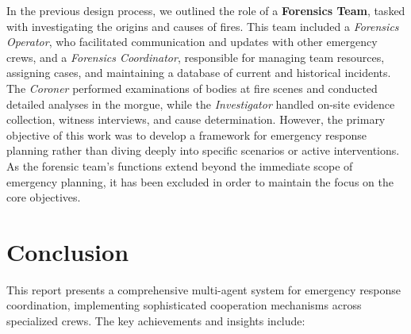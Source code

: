 \documentclass[12pt,a4paper]{article}
\begin{document}
In the previous design process, we outlined the role of a \textbf{Forensics Team}, tasked with investigating the origins and causes 
of fires. This team included a \textit{Forensics Operator}, who facilitated communication and updates with other emergency crews, 
and a \textit{Forensics Coordinator}, responsible for managing team resources, assigning cases, and maintaining a database of current 
and historical incidents. The \textit{Coroner} performed examinations of bodies at fire scenes and conducted detailed analyses in the 
morgue, while the \textit{Investigator} handled on-site evidence collection, witness interviews, and cause determination. However, the 
primary objective of this work was to develop a framework for emergency response planning rather than diving deeply into specific 
scenarios or active interventions. As the forensic team’s functions extend beyond the immediate scope of emergency planning, it 
has been excluded in order to maintain the focus on the core objectives.











\section{Conclusion}
This report presents a comprehensive multi-agent system for emergency response coordination, implementing sophisticated cooperation mechanisms across specialized crews. The key achievements and insights include:
\end{document}
